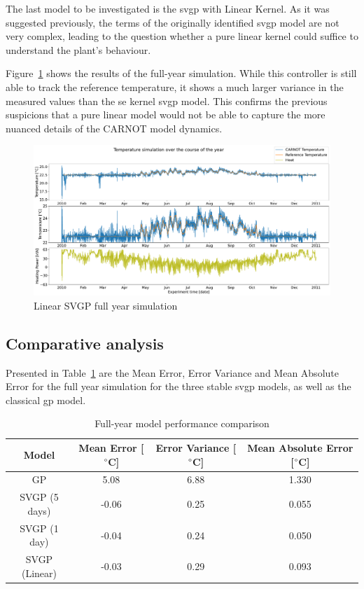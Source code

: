 The last model to be investigated is the \acrshort{svgp} with Linear Kernel. As
it was suggested previously, the terms of the originally identified
\acrshort{svgp} model are not very complex, leading to the question whether a
pure linear kernel could suffice to understand the plant's behaviour.

Figure~\ref{fig:SVGP_linear_fullyear_simulation} shows the results of the
full-year simulation. While this controller is still able to track the reference
temperature, it shows a much larger variance in the measured values than the
\acrshort{se} kernel \acrshort{svgp} model. This confirms the previous
suspicions that a pure linear model would not be able to capture the more
nuanced details of the CARNOT model dynamics.

\begin{figure}[ht]
    \centering
    \includegraphics[width =
    \textwidth]{Plots/10_SVGP_480pts_inf_window_12_averageYear_LinearKernel_fullyear.pdf}
    \caption{Linear SVGP full year simulation}
    \label{fig:SVGP_linear_fullyear_simulation}
\end{figure}

\clearpage

\subsection{Comparative analysis}

Presented in Table~\ref{tab:Model_comparations} are the Mean Error, Error
Variance and Mean Absolute Error for the full year simulation for the three
stable \acrshort{svgp} models, as well as the classical \acrshort{gp} model. 

\begin{table}[ht]
\centering
    \begin{tabular}{||c c c c||}
        \hline
        Model & Mean Error [$\degree$C] & Error Variance [$\degree$C] & Mean
        Absolute Error [$\degree$C]\\
        \hline \hline
        GP & 5.08 & 6.88 & 1.330 \\ 
        SVGP (5 days) & -0.06 & 0.25 & 0.055 \\ 
        SVGP (1 day) & -0.04 & 0.24 & 0.050 \\ 
        SVGP (Linear)& -0.03 & 0.29 & 0.093 \\ 
        \hline
    \end{tabular}
\caption{Full-year model performance comparison}
\label{tab:Model_comparations}
\end{table}

